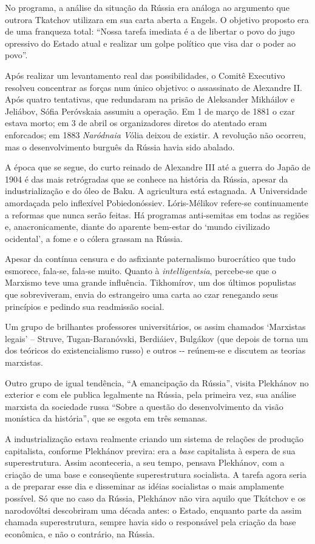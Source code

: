 No programa, a análise da situação da Rússia era análoga ao argumento
que outrora Tkatchov utilizara em sua carta aberta a Engels. O objetivo
proposto era de uma franqueza total: ``Nossa tarefa imediata é a de
libertar o povo do jugo opressivo do Estado atual e realizar um golpe
político que visa dar o poder ao povo''.

Após realizar um levantamento real das possibilidades, o Comitê
Executivo resolveu concentrar as forças num único objetivo: o
assassinato de Alexandre II. Após quatro tentativas, que redundaram na
prisão de Aleksander Mikháilov e Jeliábov, Sófia Peróvskaia assumiu a
operação. Em 1 de março de 1881 o czar estava morto; em 3 de abril os
organizadores diretos do atentado eram enforcados; em 1883
\emph{Naródnaia V}ólia deixou de existir. A revolução não ocorreu, mas o
desenvolvimento burguês da Rússia havia sido abalado.

A época que se segue, do curto reinado de Alexandre III até a guerra do
Japão de 1904 é das mais retrógradas que se conhece na história da
Rússia, apesar da industrialização e do óleo de Baku. A agricultura está
estagnada. A Universidade amordaçada pelo inflexível Pobiedonóssiev.
Lóris-Mélikov refere-se continuamente a reformas que nunca serão feitas.
Há programas anti-semitas em todas as regiões e, anacronicamente, diante
do aparente bem-estar do `mundo civilizado ocidental', a fome e o cólera
grassam na Rússia.

Apesar da contínua censura e do asfixiante paternalismo burocrático que
tudo esmorece, fala-se, fala-se muito. Quanto à \emph{intelligentsia},
percebe-se que o Marxismo teve uma grande influência. Tikhomírov, um dos
últimos populistas que sobreviveram, envia do estrangeiro uma carta ao
czar renegando seus princípios e pedindo sua readmissão social.

Um grupo de brilhantes professores universitários, os assim chamados
`Marxistas legais' -- Struve, Tugan-Baranóvski, Berdiáiev, Bulgákov (que
depois de torna um dos teóricos do existencialismo russo) e outros -\/-
reúnem-se e discutem as teorias marxistas.

Outro grupo de igual tendência, ``A emancipação da Rússia'', visita
Plekhánov no exterior e com ele publica legalmente na Rússia, pela
primeira vez, sua análise marxista da sociedade russa ``Sobre a questão
do desenvolvimento da visão monística da história'', que se esgota em
três semanas.

A industrialização estava realmente criando um sistema de relações de
produção capitalista, conforme Plekhánov previra: era a \emph{base}
capitalista à espera de sua superestrutura. Assim aconteceria, a seu
tempo, pensava Plekhánov, com a criação de uma base e conseqüente
superestrutura socialista. A tarefa agora seria a de preparar esse dia e
disseminar as idéias socialistas o mais amplamente possível. Só que no
caso da Rússia, Plekhánov não vira aquilo que Tkátchov e os narodovóltsi
descobriram uma década antes: o Estado, enquanto parte da assim chamada
superestrutura, sempre havia sido o responsável pela criação da base
econômica, e não o contrário, na Rússia.

